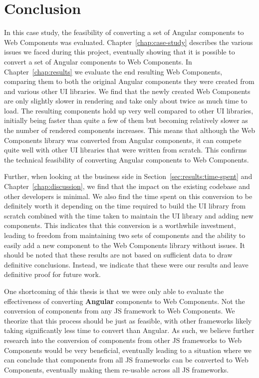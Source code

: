 \chapter{Conclusion}\label{chap:conclusion}

In this case study, the feasibility of converting a set of Angular components to Web Components was evaluated. Chapter~\ref{chap:case-study} describes the various issues we faced during this project, eventually showing that it is possible to convert a set of Angular components to Web Components. In Chapter~\ref{chap:results} we evaluate the end resulting Web Components, comparing them to both the original Angular components they were created from and various other UI libraries. We find that the newly created Web Components are only slightly slower in rendering and take only about twice as much time to load. The resulting components hold up very well compared to other UI libraries, initially being faster than quite a few of them but becoming relatively slower as the number of rendered components increases. This means that although the Web Components library was converted from Angular components, it can compete quite well with other UI libraries that were written from scratch. This confirms the technical feasibility of converting Angular components to Web Components.

Further, when looking at the business side in Section~\ref{sec:results:time-spent} and Chapter~\ref{chap:discussion}, we find that the impact on the existing codebase and other developers is minimal. We also find the time spent on this conversion to be definitely worth it depending on the time required to build the UI library from scratch combined with the time taken to maintain the UI library and adding new components. This indicates that this conversion is a worthwhile investment, leading to freedom from maintaining two sets of components and the ability to easily add a new component to the Web Components library without issues. It should be noted that these results are not based on sufficient data to draw definitive conclusions. Instead, we indicate that these were our results and leave definitive proof for future work.

One shortcoming of this thesis is that we were only able to evaluate the effectiveness of converting \textbf{Angular} components to Web Components. Not the conversion of components from any JS framework to Web Components. We theorize that this process should be just as feasible, with other frameworks likely taking significantly less time to convert than Angular. As such, we believe further research into the conversion of components from other JS frameworks to Web Components would be very beneficial, eventually leading to a situation where we can conclude that components from all JS frameworks can be converted to Web Components, eventually making them re-usable across all JS frameworks.
